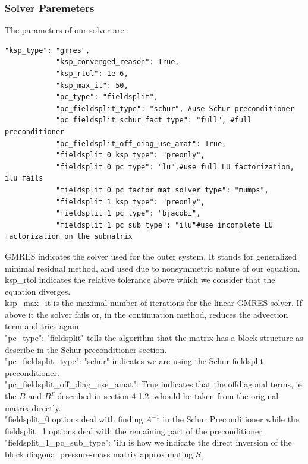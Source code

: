 \documentclass[11pt,twoside,a4paper]{article}
\begin{document}
\subsubsection{Solver Paremeters}
The parameters of our solver are :
\begin{lstlisting}
"ksp_type": "gmres",
            "ksp_converged_reason": True,
            "ksp_rtol": 1e-6,
            "ksp_max_it": 50,
            "pc_type": "fieldsplit",
            "pc_fieldsplit_type": "schur", #use Schur preconditioner
            "pc_fieldsplit_schur_fact_type": "full", #full preconditioner
            "pc_fieldsplit_off_diag_use_amat": True,
            "fieldsplit_0_ksp_type": "preonly",
            "fieldsplit_0_pc_type": "lu",#use full LU factorization, ilu fails
            "fieldsplit_0_pc_factor_mat_solver_type": "mumps",
            "fieldsplit_1_ksp_type": "preonly",
            "fieldsplit_1_pc_type": "bjacobi",
            "fieldsplit_1_pc_sub_type": "ilu"#use incomplete LU factorization on the submatrix
\end{lstlisting}
GMRES indicates the solver used for the outer system.
 It stands for generalized minimal residual method, and used due to nonsymmetric nature of our equation.\\
ksp\_rtol indicates the relative tolerance above which we consider that the equation diverges.\\
ksp\_max\_it is the maximal number of iterations for the linear GMRES solver. If above it the solver fails or, in the continuation method, reduces the advection term and tries again.\\
"pc\_type": "fieldsplit" tells the algorithm that the matrix has a block structure as describe in the Schur preconditioner section.\\
"pc\_fieldsplit\_type": "schur" indicates we are using the Schur fieldsplit preconditioner.\\
"pc\_fieldsplit\_off\_diag\_use\_amat": True indicates that the offdiagonal terms, ie the $B$ and $B^T$ described in section 4.1.2, whould be taken from the original matrix directly. \\
"fieldsplit\_0 options deal with finding $A^{-1}$ in the Schur Preconditioner while the fieldsplit\_1 options deal with the remaining part of the preconditioner.\\
 "fieldsplit\_1\_pc\_sub\_type": "ilu is how we indicate the direct inversion of the block diagonal pressure-mass matrix approximating $S$.
\end{document}

